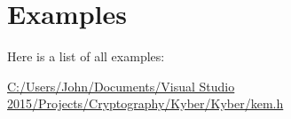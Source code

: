 \section{Examples}
Here is a list of all examples\+:\begin{DoxyCompactItemize}
\item 
\hyperlink{_c_1_2_users_2_john_2_documents_2_visual_01_studio_012015_2_projects_2_cryptography_2_kyber_2_kyber_2kem_8h-example}{C\+:/\+Users/\+John/\+Documents/\+Visual Studio 2015/\+Projects/\+Cryptography/\+Kyber/\+Kyber/kem.\+h}
\end{DoxyCompactItemize}
